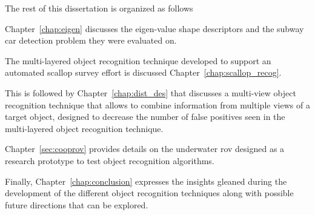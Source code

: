 \documentclass {udthesis}
\begin{document}
The rest of this dissertation is organized as follows 
\begin{enumerate*}[label=(\roman*)] 
  \item Chapter~\ref{chap:eigen} discusses the eigen-value shape descriptors and the subway car detection problem they were evaluated on.
  \item The multi-layered object recognition technique developed to support an automated scallop survey effort 
  is discussed Chapter~\ref{chap:scallop_recog}.
  \item This is followed by Chapter~\ref{chap:dist_des} that discusses a multi-view object recognition technique that allows to combine information from multiple views of a target object, designed to decrease the number of false positives seen in the multi-layered object recognition technique.
  \item Chapter~\ref{sec:cooprov} provides details on the underwater \gls{rov} designed as a research prototype to test object recognition algorithms.
  \item Finally, Chapter~\ref{chap:conclusion} expresses the insights gleaned during the development of the different object recognition techniques along with possible future directions that can be explored.
\end{enumerate*}

\printglossary[type=\acronymtype]                  
\end{document}
